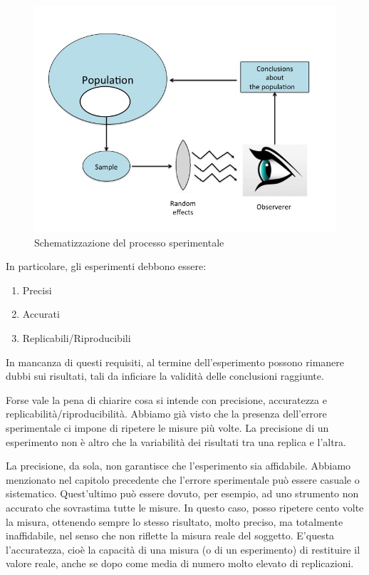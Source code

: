 \documentclass[a4paper,12pt,oneside]{book}
\providecommand{\tightlist}{%
  \setlength{\itemsep}{0pt}\setlength{\parskip}{0pt}}
\begin{document}
\begin{figure}
\centering
\includegraphics{_images/ExperimentalError.jpg}
\caption{Schematizzazione del processo sperimentale}
\end{figure}

In particolare, gli esperimenti debbono essere:

\begin{enumerate}
\def\labelenumi{\arabic{enumi}.}
\tightlist
\item
  Precisi
\item
  Accurati
\item
  Replicabili/Riproducibili
\end{enumerate}

In mancanza di questi requisiti, al termine dell'esperimento possono
rimanere dubbi sui risultati, tali da inficiare la validità delle
conclusioni raggiunte.

Forse vale la pena di chiarire cosa si intende con precisione,
accuratezza e replicabilità/riproducibilità. Abbiamo già visto che la
presenza dell'errore sperimentale ci impone di ripetere le misure più
volte. La precisione di un esperimento non è altro che la variabilità
dei risultati tra una replica e l'altra.

La precisione, da sola, non garantisce che l'esperimento sia affidabile.
Abbiamo menzionato nel capitolo precedente che l'errore sperimentale può
essere casuale o sistematico. Quest'ultimo può essere dovuto, per
esempio, ad uno strumento non accurato che sovrastima tutte le misure.
In questo caso, posso ripetere cento volte la misura, ottenendo sempre
lo stesso risultato, molto preciso, ma totalmente inaffidabile, nel
senso che non riflette la misura reale del soggetto. E'questa
l'accuratezza, cioè la capacità di una misura (o di un esperimento) di
restituire il valore reale, anche se dopo come media di numero molto
elevato di replicazioni.
\end{document}
